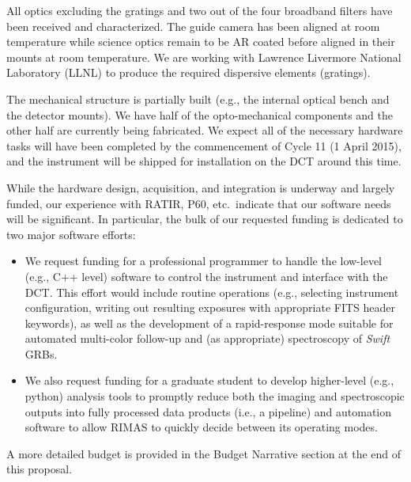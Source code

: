 \documentclass[letterpaper,11pt]{article}
\begin{document}
All optics excluding the gratings and two out of the four broadband filters have been received and characterized.  
The guide camera has been aligned at room temperature while science optics remain to be AR 
coated before aligned in their mounts at room temperature. We are working with Lawrence Livermore 
National Laboratory (LLNL) to produce the required dispersive elements (gratings).  

The mechanical structure is partially built (e.g., the internal optical bench and 
the detector mounts).  We have half of the opto-mechanical components and the other half 
are currently being fabricated.   We expect all of the necessary 
hardware tasks will have been completed by the commencement of Cycle 11 (1 April 2015), 
and the instrument will be shipped for installation on the DCT around this time.

\smallskip

While the hardware design, acquisition, and integration is underway and largely 
funded, our experience with RATIR, P60, etc.~indicate that our software needs will
be significant.  In particular, the bulk of our requested funding is dedicated to 
two major software efforts:
\begin{itemize}
\item We request funding for a professional programmer to handle the low-level (e.g.,
C++ level) software to control the instrument and interface with the DCT.  This 
effort would include routine operations (e.g., selecting instrument configuration,
writing out resulting exposures with appropriate FITS header keywords), as well as 
the development of a rapid-response mode suitable for automated multi-color 
follow-up and (as appropriate) spectroscopy of \textit{Swift} GRBs.

\item We also request funding for a graduate student to develop higher-level (e.g.,
python) analysis tools to promptly reduce both the imaging and spectroscopic outputs
into fully processed data products (i.e., a pipeline) and automation software to allow 
RIMAS to quickly decide between its operating modes.    
\end{itemize}
A more detailed budget is provided in the Budget Narrative section at the end of 
this proposal.\\
\end{document}

